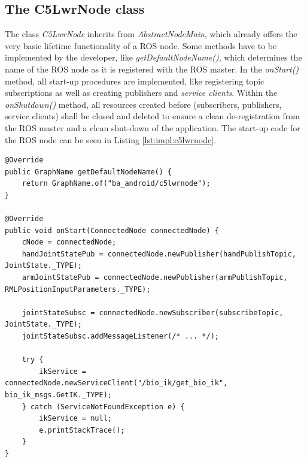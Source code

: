 \subsection{The C5LwrNode class}

The class \textit{C5LwrNode} inherits from \textit{AbstractNodeMain}, which already offers the very basic lifetime functionality of a ROS node. Some methods have to be implemented by the developer, like \textit{getDefaultNodeName()}, which determines the name of the ROS node as it is registered with the ROS master. In the \textit{onStart()} method, all start-up procedures are implemented, like registering topic subscriptions as well as creating publishers and \textit{service clients}. Within the \textit{onShutdown()} method, all resources created before (subscribers, publishers, service clients) shall be closed and deleted to ensure a clean de-registration from the ROS master and a clean shut-down of the application. The start-up code for the ROS node can be seen in Listing \ref{lst:impl:c5lwrnode}.

\begin{lstlisting}[caption={Startup of the C5LwrNode}, label=lst:impl:c5lwrnode]
@Override
public GraphName getDefaultNodeName() {
	return GraphName.of("ba_android/c5lwrnode");
}

@Override
public void onStart(ConnectedNode connectedNode) {
	cNode = connectedNode;
	handJointStatePub = connectedNode.newPublisher(handPublishTopic, JointState._TYPE);
	armJointStatePub = connectedNode.newPublisher(armPublishTopic, RMLPositionInputParameters._TYPE);

	jointStateSubsc = connectedNode.newSubscriber(subscribeTopic, JointState._TYPE);
	jointStateSubsc.addMessageListener(/* ... */);

	try {
		ikService = connectedNode.newServiceClient("/bio_ik/get_bio_ik", bio_ik_msgs.GetIK._TYPE);
	} catch (ServiceNotFoundException e) {
		ikService = null;
		e.printStackTrace();
	}
}
\end{lstlisting}

